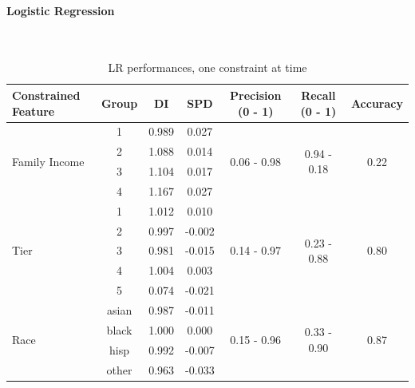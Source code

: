 \documentclass{article}
\begin{document}
\paragraph{Logistic Regression}\mbox{}\\
\begin{table}[H]
\caption{LR performances, one constraint at time}
\begin{tabular}{lccc|ccc}
\hline
\textbf{Constrained Feature} & \textbf{Group} & \textbf{DI} & \textbf{SPD} & \textbf{Precision (0 - 1)} & \textbf{Recall (0 - 1)} & \textbf{Accuracy} \\
\hline
\multirow{4}{*}{Family Income} & 1 & 0.989 & 0.027 & \multirow{4}{*}{0.06 - 0.98} & \multirow{4}{*}{0.94 - 0.18} & \multirow{4}{*}{0.22} \\
                               & 2 & 1.088 & 0.014 &                                &                               &                        \\
                               & 3 & 1.104 & 0.017 &                                &                               &                        \\
                               & 4 & 1.167 & 0.027 &                                &                               &                        \\
\hline
\multirow{5}{*}{Tier}          & 1 & 1.012 & 0.010 & \multirow{5}{*}{0.14 - 0.97} & \multirow{5}{*}{0.23 - 0.88} & \multirow{5}{*}{0.80} \\
                               & 2 & 0.997 & -0.002 &                               &                               &                        \\
                               & 3 & 0.981 & -0.015 &                               &                               &                        \\
                               & 4 & 1.004 & 0.003 &                                &                               &                        \\
                               & 5 & 0.074 & -0.021 &                               &                               &                        \\
\hline
\multirow{4}{*}{Race}          & asian & 0.987 & -0.011 & \multirow{4}{*}{0.15 - 0.96} & \multirow{4}{*}{0.33 - 0.90} & \multirow{4}{*}{0.87} \\
                               & black & 1.000 & 0.000  &                               &                               &                        \\
                               & hisp  & 0.992 & -0.007 &                               &                               &                        \\
                               & other & 0.963 & -0.033 &                               &                               &                        \\
\end{tabular}
\end{table}
\end{document}
